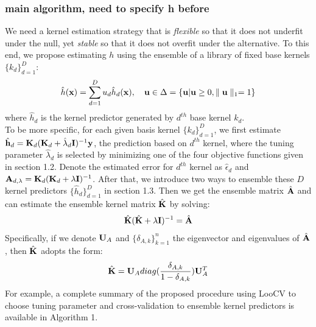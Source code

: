 \documentclass[11pt]{article}
\begin{document}
\subsubsection{{main algorithm, need to specify h before}}
We need a kernel estimation strategy that is \textsl{flexible} so that it does not underfit under the null, yet \textsl{stable} so that it does not overfit under the alternative. To this end, we propose estimating $h$ using the ensemble of a library of fixed base kernels $\{k_d\}_{d=1}^D$:
\begin{align}
\hat{h}({\bf x})=\sum_{d=1}^D u_d\hat{h}_d({\bf x}), \quad {\bf u} \in \Delta=\{{\bf u} | {\bf u} \geq 0, \parallel {\bf u} \parallel_1=1\}
\end{align}
where $\hat{h}_d$ is the kernel predictor generated by $d^{th}$ base kernel $k_d$.\\
To be more specific, for each given basis kernel $\{k_d\}_{d=1}^D$, we first estimate $\hat{{\bf h}}_d={\bf K}_d({\bf K}_d+\hat{\lambda}_d{\bf I})^{-1}{\bf y}$, the prediction based on $d^{th}$ kernel, where the tuning parameter $\hat{\lambda}_d$ is selected by minimizing one of the four objective functions given in section 1.2. Denote the estimated error for $d^{th}$ kernel as $\hat{\epsilon}_d$ and ${\bf A}_{d,\lambda}={\bf K}_d({\bf K}_d+\lambda{\bf I})^{-1}$. After that, we introduce two ways to ensemble these $D$ kernel predictors $\{\hat{h}_d\}_{d=1}^D$ in section 1.3. Then we get the ensemble matrix $\hat{{\bf A}}$ and can estimate the ensemble kernel matrix $\hat{{\bf K}}$ by solving:
\begin{align*}
\hat{{\bf K}}(\hat{{\bf K}}+\lambda {\bf I})^{-1}=\hat{{\bf A}}
\end{align*}
Specifically, if we denote ${\bf U}_A$ and $\{\delta_{A,k}\}_{k=1}^n$ the eigenvector and eigenvalues of $\hat{{\bf A}}$, then $\hat{{\bf K}}$ adopts the form:
\begin{align*}
\hat{{\bf K}}={\bf U}_A diag(\frac{\delta_{A,k}}{1-\delta_{A,k}}){\bf U}_A^T
\end{align*}
 \vspace{1em}
For example, a complete summary of the proposed procedure using LooCV to choose tuning parameter and cross-validation to ensemble kernel predictors is available in Algorithm 1.

\end{document}
